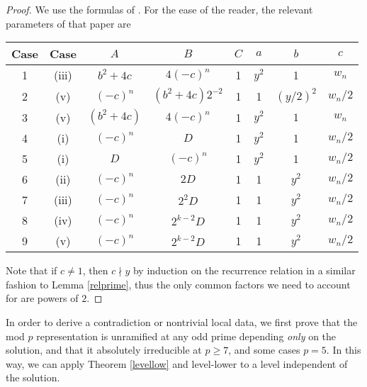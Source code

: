 \documentclass[12pt]{amsart}
\theoremstyle{definition}
\newcommand{\notdiv}{\nmid}
\begin{document}
\begin{proof}
We use the formulas of \cite{bennett04}.  For the ease of the reader, the relevant parameters of that paper are 
\begin{center} 
\begin{tabular}{c | c | c | c | c | c | c | c}
Case & \cite{bennett04} Case & $A$ & $B$ & $C$ & $a$ & $b$ & $c$ \\ \hline \hline
1 & (iii) & $b^2+4c$ & $4(-c)^n$ & 1 & $y^2$ & 1 & $w_n$ \\ \hline
2 & (v) & $(-c)^n$ & $(b^2+4c)2^{-2}$ & 1 & 1 & $(y/2)^2$ & $w_n/2$ \\ \hline
3 & (v) & $(b^2+4c)$ & $4(-c)^n$ & 1 & $y^2$ & $1$ & $w_n$ \\ \hline
4 & (i) & $(-c)^n$ & $D$ & 1 & $y^2$ & 1 & $w_n/2$ \\ \hline
5 & (i) & $D$ & $(-c)^n$ & 1 & $y^2$ & 1 & $w_n/2$ \\ \hline
6 & (ii) & $(-c)^n$ & $2D$ & 1 & 1 & $y^2$ & $w_n/2$ \\ \hline
7 & (iii) & $(-c)^n$ & $2^2D$ & 1 & 1 & $y^2$ & $w_n/2$ \\ \hline
8 & (iv) & $(-c)^n$ & $2^{k-2}D$ & 1 & 1 & $y^2$ & $w_n/2$ \\ \hline
9 & (v) & $(-c)^n$ & $2^{k-2}D$ & 1 & 1 & $y^2$ & $w_n/2$ \\ \hline
\end{tabular}
\end{center}
Note that if $c \neq 1$, then $c \notdiv y$ by induction on the recurrence relation in a similar fashion to Lemma \ref{relprime}, thus the only common factors we need to account for are powers of $2$.
\end{proof}

In order to derive a contradiction or nontrivial local data, we first prove that the mod $p$ representation is unramified at any odd prime depending \emph{only} on the solution, and that it absolutely irreducible at $p \geq 7$, and some cases $p=5$.  In this way, we can apply Theorem \ref{levellow} and level-lower to a level independent of the solution.  
\end{document}
